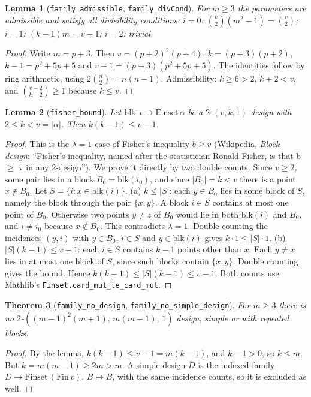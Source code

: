 \documentclass[11pt]{article}
\newtheorem{theorem}{Theorem}
\newtheorem{lemma}[theorem]{Lemma}
\theoremstyle{definition}
\begin{document}
\begin{lemma}[\texttt{family\_admissible}, \texttt{family\_divCond}]
For $m\ge3$ the parameters are admissible and satisfy all divisibility conditions:
$i=0$: $\binom{k}{2}(m^2-1)=\binom{v}{2}$; $i=1$: $(k-1)m=v-1$; $i=2$: trivial.
\end{lemma}
\begin{proof}
Write $m=p+3$. Then $v=(p+2)^2(p+4)$, $k=(p+3)(p+2)$, $k-1=p^2+5p+5$ and
$v-1=(p+3)(p^2+5p+5)$. The identities follow by ring arithmetic, using
$2\binom n2=n(n-1)$. Admissibility: $k\ge 6>2$, $k+2<v$, and
$\binom{v-2}{k-2}\ge1$ because $k\le v$.
\end{proof}

\begin{lemma}[\texttt{fisher\_bound}]
Let $\mathrm{blk}:\iota\to\mathrm{Finset}\,\alpha$ be a $2$-$(v,k,1)$ design with $2\le k<v=|\alpha|$.
Then $k(k-1)\le v-1$.
\end{lemma}
\begin{proof}
This is the $\lambda=1$ case of Fisher's inequality $b\ge v$ (Wikipedia, \emph{Block design}:
``Fisher's inequality, named after the statistician Ronald Fisher, is that b $\ge$ v in any
2-design''). We prove it directly by two double counts.
Since $v\ge2$, some pair lies in a block $B_0=\mathrm{blk}(i_0)$, and since $|B_0|=k<v$ there is a
point $x\notin B_0$. Let $S=\{i: x\in\mathrm{blk}(i)\}$.
(a) $k\le|S|$: each $y\in B_0$ lies in some block of $S$, namely the block through the pair $\{x,y\}$.
A block $i\in S$ contains at most one point of $B_0$. Otherwise two points $y\ne z$ of $B_0$ would
lie in both $\mathrm{blk}(i)$ and $B_0$, and $i\ne i_0$ because $x\notin B_0$. This contradicts
$\lambda=1$. Double counting the incidences $(y,i)$ with $y\in B_0$, $i\in S$ and
$y\in\mathrm{blk}(i)$ gives $k\cdot1\le|S|\cdot1$.
(b) $|S|(k-1)\le v-1$: each $i\in S$ contains $k-1$ points other than $x$. Each $y\ne x$ lies in at
most one block of $S$, since such blocks contain $\{x,y\}$. Double counting gives the bound.
Hence $k(k-1)\le|S|(k-1)\le v-1$. Both counts use Mathlib's
\texttt{Finset.card\_mul\_le\_card\_mul}.
\end{proof}

\begin{theorem}[\texttt{family\_no\_design}, \texttt{family\_no\_simple\_design}]
For $m\ge3$ there is no $2$-$((m-1)^2(m+1),\,m(m-1),\,1)$ design, simple or with repeated blocks.
\end{theorem}
\begin{proof}
By the lemma, $k(k-1)\le v-1=m(k-1)$, and $k-1>0$, so $k\le m$. But $k=m(m-1)\ge2m>m$. A simple
design $D$ is the indexed family $D\to\mathrm{Finset}\,(\mathrm{Fin}\,v)$, $B\mapsto B$, with the
same incidence counts, so it is excluded as well.
\end{proof}
\end{document}
